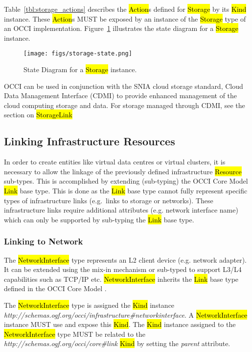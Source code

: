 \documentclass[10pt,a4paper]{article}
\begin{document}
Table~\ref{tbl:storage_actions} describes the \hl{Action}s defined for
\hl{Storage} by its \hl{Kind} instance. These \hl{Action}s MUST be
exposed by an instance of the \hl{Storage} type of an OCCI
implementation.  Figure~\ref{fig:storage_state} illustrates the state
diagram for a \hl{Storage} instance.

\begin{figure}[!h]
	\centering
	\texttt{[image: figs/storage-state.png]}
	\caption{State Diagram for a \hl{Storage} instance.}
	\label{fig:storage_state}
\end{figure}

OCCI can be used in conjunction with the SNIA cloud storage standard,
Cloud Data Management Interface (CDMI) \cite{cdmi} to provide enhanced
management of the cloud computing storage and data. For storage
managed through CDMI, see the section on \hl{StorageLink}

\subsection{Linking Infrastructure Resources}
In order to create entities like virtual data centres or virtual
clusters, it is necessary to allow the linkage of the previously
defined infrastructure \hl{Resource} sub-types. This is accomplished
by extending (sub-typing) the OCCI Core Model \hl{Link} base type.
This is done as the \hl{Link} base type cannot fully represent
specific types of infrastructure links (e.g.~links to storage or
networks).  These infrastructure links require additional attributes
(e.g.  network interface name) which can only be supported by
sub-typing the \hl{Link} base type.

\subsubsection{Linking to Network}
The \hl{NetworkInterface} type represents an L2 client device (e.g.
network adapter). It can be extended using the mix-in mechanism or
sub-typed to support L3/L4 capabilities such as TCP/IP etc.
\hl{NetworkInterface} inherits the \hl{Link} base type defined in the
OCCI Core Model \cite{occi:core}.

The \hl{NetworkInterface} type is assigned the \hl{Kind} instance
\textit{http://schemas.ogf.org/occi/infrastructure\#networkinterface}.
A \hl{NetworkInterface} instance MUST use and expose this \hl{Kind}.
The \hl{Kind} instance assigned to the \hl{NetworkInterface} type MUST
be related to the \textit{http://schemas.ogf.org/occi/core\#link}
\hl{Kind} by setting the \textit{parent} attribute.
\end{document}
